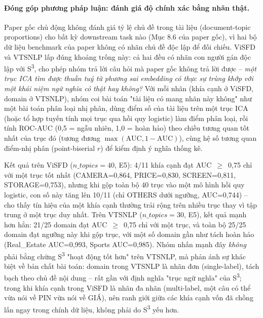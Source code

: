 \documentclass[11pt]{article}
\begin{document}
\paragraph{Đóng góp phương pháp luận: đánh giá độ chính xác bằng nhãn
thật.} Paper gốc chủ động không đánh giá tỷ lệ chủ đề trong tài liệu
(document-topic proportions) cho bất kỳ downstream task nào (Mục 8.6 của
paper gốc), vì hai bộ dữ liệu benchmark của paper không có nhãn chủ đề độc
lập để đối chiếu. ViSFD và VTSNLP lấp đúng khoảng trống này: cả hai đều có
nhãn con người gán độc lập với S\textsuperscript{3}, cho phép nhóm trả lời
câu hỏi mà paper gốc không trả lời được -- \emph{một trục ICA tìm được
thuần tuý từ phương sai embedding có thực sự trùng khớp với một khái niệm
ngữ nghĩa có thật hay không?} Với mỗi nhãn (khía cạnh ở ViSFD, domain ở
VTSNLP), nhóm coi bài toán "tài liệu có mang nhãn này không" như một bài
toán phân loại nhị phân, dùng điểm số của tài liệu trên một trục ICA (hoặc
tổ hợp tuyến tính mọi trục qua hồi quy logistic) làm điểm phân loại, rồi
tính ROC-AUC (0,5 = ngẫu nhiên, 1,0 = hoàn hảo) theo chiều tương quan tốt
nhất của trục đó (tương đương $\max(\text{AUC}, 1-\text{AUC})$), cùng hệ
số tương quan điểm-nhị phân (point-biserial $r$) để kiểm định ý nghĩa
thống kê.

Kết quả trên ViSFD ($n\_topics=40$, E5): 4/11 khía cạnh đạt AUC~$\geq$~0,75
chỉ với một trục tốt nhất (CAMERA=0,864, PRICE=0,830, SCREEN=0,811,
STORAGE=0,753), nhưng khi gộp toàn bộ 40 trục vào một mô hình hồi quy
logistic, con số này tăng lên 10/11 (chỉ OTHERS dưới ngưỡng, AUC=0,744) --
cho thấy tín hiệu của một khía cạnh thường trải rộng trên nhiều trục thay
vì tập trung ở một trục duy nhất. Trên VTSNLP ($n\_topics=30$, E5), kết quả
mạnh hơn hẳn: 21/25 domain đạt AUC~$\geq$~0,75 chỉ với một trục, và toàn
bộ 25/25 domain đạt ngưỡng này khi gộp trục, với một số domain gần như
tách hoàn hảo (Real\_Estate AUC=0,993, Sports AUC=0,985). Nhóm nhấn mạnh
đây \emph{không} phải bằng chứng S\textsuperscript{3} "hoạt động tốt hơn"
trên VTSNLP, mà phản ánh sự khác biệt về bản chất bài toán: domain trong
VTSNLP là nhãn đơn (single-label), tách bạch theo chủ đề nội dung -- rất
gần với định nghĩa "trục ngữ nghĩa" của S\textsuperscript{3}; trong khi
khía cạnh trong ViSFD là nhãn đa nhãn (multi-label, một câu có thể vừa nói
về PIN vừa nói về GIÁ), nên ranh giới giữa các khía cạnh vốn đã chồng lấn
ngay trong chính dữ liệu, không phải do S\textsuperscript{3} yếu hơn.
\end{document}
